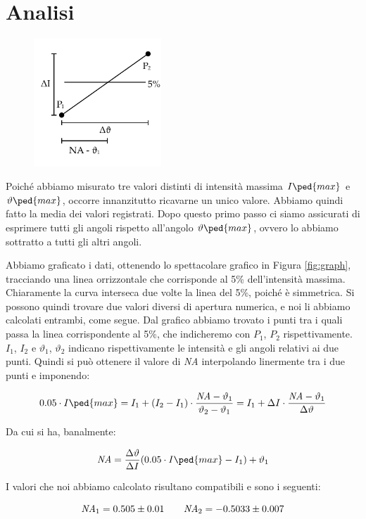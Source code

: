 \section{Analisi}

\begin{figure}
    \vspace{-10mm}
    \begin{center}
        \includegraphics[width=48mm]{drawing.pdf}
    \end{center}
    \vspace{-10mm}
\end{figure}

Poiché abbiamo misurato tre valori distinti di intensità massima $I\ped{max}$ e $\vartheta\ped{max}$, occorre innanzitutto ricavarne un unico valore. Abbiamo quindi fatto la media dei valori registrati. Dopo questo primo passo ci siamo assicurati di esprimere tutti gli angoli rispetto
all'angolo $\vartheta\ped{max}$, ovvero lo abbiamo sottratto a tutti gli altri angoli.

Abbiamo graficato i dati, ottenendo lo spettacolare grafico in Figura \ref{fig:graph}, tracciando una linea orrizzontale
che corrisponde al 5\% dell'intensità massima. Chiaramente la curva interseca due volte la linea del 5\%, poiché è simmetrica.
Si possono quindi trovare due valori diversi di apertura numerica, e noi li abbiamo calcolati entrambi, come segue.
Dal grafico abbiamo trovato i punti tra i quali passa la linea corrispondente al 5\%,
che indicheremo con $P_1$, $P_2$ rispettivamente. $I_1$, $I_2$ e $\vartheta_1$, $\vartheta_2$ indicano rispettivamente le intensità e gli angoli
relativi ai due punti. Quindi si può ottenere il valore di \emph{NA} interpolando linermente tra i due punti e imponendo:

\begin{equation}
        0.05 \cdot I\ped{max} = I_1 + (I_2 - I_1) \cdot \frac{\emph{NA} - \vartheta_1}{\vartheta_2 - \vartheta_1} \\
                              = I_1 + \Delta I \cdot \frac{\emph{NA} - \vartheta_1}{\Delta \vartheta}
\end{equation}

Da cui si ha, banalmente:

\begin{equation}
    \emph{NA} = \frac{\Delta \vartheta}{\Delta I} (0.05 \cdot I\ped{max} - I_1) + \vartheta_1
\end{equation}

I valori che noi abbiamo calcolato risultano compatibili e sono i seguenti:

\begin{equation}
    \emph{NA}_1 = 0.505 \pm 0.01 \qquad \emph{NA}_2 = -0.5033 \pm 0.007
\end{equation}